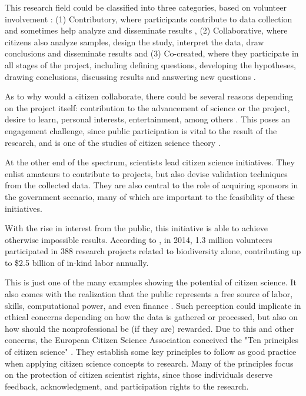 This research field could be classified into three categories, based on volunteer involvement \cite{follett2015analysis}: (1) Contributory, where participants contribute to data collection and sometimes help analyze and disseminate results \cite{bonney2009citizen}, (2) Collaborative, where citizens also analyze samples, design the study, interpret the data, draw conclusions and disseminate results \cite{faridani2009networked} and (3) Co-created, where they participate in all stages of the project, including defining questions, developing the hypotheses, drawing conclusions, discussing results and answering new questions \cite{hill2012notes}.

As to why would a citizen collaborate, there could be several reasons depending on the project itself: contribution to the advancement of science or the project, desire to learn, personal interests, entertainment, among others \cite{tinati2016because}. This poses an engagement challenge, since public participation is vital to the result of the research, and is one of the studies of citizen science theory \cite{bowser2013using}.

At the other end of the spectrum, scientists lead citizen science initiatives. They enlist amateurs to contribute to projects, but also devise validation techniques from the collected data. They are also central to the role of acquiring sponsors in the government scenario, many of which are important to the feasibility of these initiatives.

With the rise in interest from the public, this initiative is able to achieve otherwise impossible results. According to \cite{theobald2015global}, in 2014, 1.3 million volunteers participated in 388 research projects related to biodiversity alone, contributing up to \$2.5 billion of in-kind labor annually.

This is just one of the many examples showing the potential of citizen science. It also comes with the realization that the public represents a free source of labor, skills, computational power, and even finance \cite{silvertown2009new}. Such perception could implicate in ethical concerns depending on how the data is gathered or processed, but also on how should the nonprofessional be (if they are) rewarded. Due to this and other concerns, the European Citizen Science Association conceived the "Ten principles of citizen science" \cite{robinson2018ten}. They establish some key principles to follow as good practice when applying citizen science concepts to research. Many of the principles focus on the protection of citizen scientist rights, since those individuals deserve feedback, acknowledgment, and participation rights to the research.

